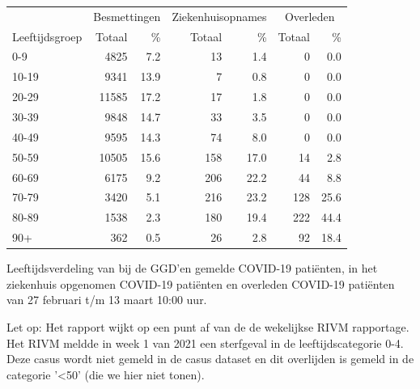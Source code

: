 \documentclass[
  english,
  man,floatsintext]{apa6}
\begin{document}
\begin{table}
\centering\begingroup\fontsize{11}{13}\selectfont

\begin{threeparttable}
\begin{tabular}{lrrrrrr}
\toprule
\multicolumn{1}{c}{ } & \multicolumn{2}{c}{Besmettingen} & \multicolumn{2}{c}{Ziekenhuisopnames} & \multicolumn{2}{c}{Overleden} \\
\cmidrule(l{3pt}r{3pt}){2-3} \cmidrule(l{3pt}r{3pt}){4-5} \cmidrule(l{3pt}r{3pt}){6-7}
Leeftijdsgroep & Totaal & \% & Totaal & \% & Totaal & \%\\
\midrule
0-9 & 4825 & 7.2 & 13 & 1.4 & 0 & 0.0\\
10-19 & 9341 & 13.9 & 7 & 0.8 & 0 & 0.0\\
20-29 & 11585 & 17.2 & 17 & 1.8 & 0 & 0.0\\
30-39 & 9848 & 14.7 & 33 & 3.5 & 0 & 0.0\\
40-49 & 9595 & 14.3 & 74 & 8.0 & 0 & 0.0\\
50-59 & 10505 & 15.6 & 158 & 17.0 & 14 & 2.8\\
60-69 & 6175 & 9.2 & 206 & 22.2 & 44 & 8.8\\
70-79 & 3420 & 5.1 & 216 & 23.2 & 128 & 25.6\\
80-89 & 1538 & 2.3 & 180 & 19.4 & 222 & 44.4\\
90+ & 362 & 0.5 & 26 & 2.8 & 92 & 18.4\\
\bottomrule
\end{tabular}
\begin{tablenotes}
\item[1] Leeftijdsverdeling van bij de GGD’en gemelde COVID-19 patiënten, in het ziekenhuis opgenomen COVID-19 patiënten en overleden COVID-19 patiënten van 27 februari t/m 13 maart 10:00 uur.
\item[2] Let op: Het rapport wijkt op een punt af van de de wekelijkse RIVM rapportage. Het RIVM meldde in week 1 van 2021 een sterfgeval in de leeftijdscategorie 0-4. Deze casus wordt niet gemeld in de casus dataset en dit overlijden is gemeld in de categorie '<50' (die we hier niet tonen).
\end{tablenotes}
\end{threeparttable}
\endgroup{}
\end{table}

\newpage
\end{document}
